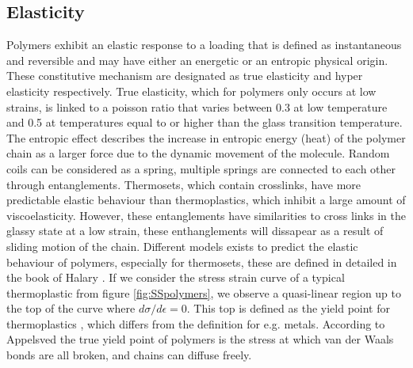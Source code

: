 \subsection{Elasticity}
Polymers exhibit an elastic response to a loading that is defined as instantaneous and reversible and may have either an energetic or an entropic physical origin. These constitutive mechanism are designated as true elasticity and hyper elasticity respectively. True elasticity, which for polymers only occurs at low strains, is linked to a poisson ratio that varies between 0.3 at low temperature and 0.5 at temperatures equal to or higher than the glass transition temperature. 
The entropic effect describes the increase in entropic energy (heat) of the polymer chain as a larger force due to the dynamic movement of the molecule. 
Random coils can be considered as a spring, multiple springs are connected to each other through entanglements. Thermosets, which contain crosslinks, have more predictable elastic behaviour than thermoplastics, which inhibit a large amount of viscoelasticity. However, these entanglements have similarities to cross links in the glassy state at a low strain, these enthanglements will dissapear as a result of sliding motion of the chain. Different models exists to predict the elastic behaviour of polymers, especially for thermosets, these are defined in detailed in the book of Halary \cite{Halary2011PolymerMaterials}. If we consider the stress strain curve of a typical thermoplastic from figure \ref{fig:SSpolymers}, we observe a quasi-linear region up to the top of the curve where $d\sigma/d\epsilon=0$. This top is defined as the yield point for thermoplastics \cite{Afd2016NEN-EN-ISO527-2}, which differs from the definition for e.g. metals. According to Appelsved \cite{Appelsved2012InvestigationModels} the true yield point of polymers is the stress at which van der Waals bonds are all broken, and chains can diffuse freely.  


